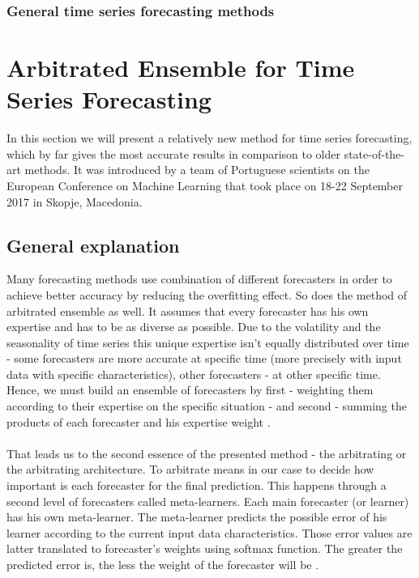 \documentclass[runningheads,a4paper]{llncs}[2015/06/24]
\begin{document}
		\subsubsection{General time series forecasting methods}
\section{Arbitrated Ensemble for Time Series Forecasting} In this section we will present a relatively new method for time series forecasting, which by far gives the most accurate results in comparison to older state-of-the-art methods. It was introduced by a team of Portuguese scientists on the European Conference on Machine Learning that took place on 18-22 September 2017 in Skopje, Macedonia. 

\subsection{General explanation}
Many forecasting methods use combination of different forecasters in order to achieve better accuracy by reducing the overfitting effect. So does the method of arbitrated ensemble as well. It assumes that every forecaster has his own expertise and has to be as diverse as possible. Due to the volatility and the seasonality of time series this unique expertise isn't equally distributed over time - some forecasters are more accurate at specific time (more precisely with input data with specific characteristics), other forecasters - at other specific time. Hence, we must build an ensemble of forecasters by first - weighting them according to their expertise on the specific situation - and second - summing the products of each forecaster and his expertise weight \cite{VtorCerqueira2017}. \\\\That leads us to the second essence of the presented method - the arbitrating or the arbitrating architecture. To arbitrate means in our case to decide how important is each forecaster for the final prediction. This happens through a second level of forecasters called meta-learners. Each main forecaster (or learner) has his own meta-learner. The meta-learner predicts the possible error of his learner according to the current input data characteristics. Those error values are latter  translated to forecaster's weights using  softmax function. The greater the predicted error is, the less the weight of the forecaster will be \cite{VtorCerqueira2017}.
\vspace{-\topsep}
\end{document}
